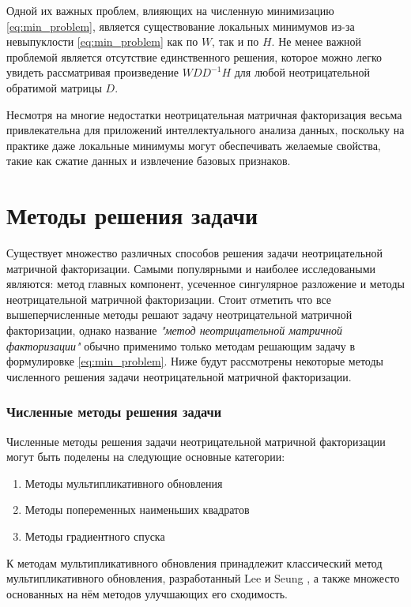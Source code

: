 Одной их важных проблем, влияющих на численную минимизацию \eqref{eq:min_problem},
является существование локальных минимумов
из-за невыпуклости \eqref{eq:min_problem} как по $W$, так и по $H$.
Не менее важной проблемой является отсутствие единственного решения,
которое можно легко увидеть рассматривая произведение $WDD^{− 1}H$ для любой неотрицательной обратимой матрицы $D$.

Несмотря на многие недостатки неотрицательная матричная факторизация весьма привлекательна для приложений интеллектуального анализа данных,
поскольку на практике даже локальные минимумы могут обеспечивать желаемые свойства, такие как сжатие данных и извлечение базовых признаков.





\newpage





\section{Методы решения задачи}

Существует множество различных способов решения задачи неотрицательной матричной факторизации.
Самыми популярными и наиболее исследоваными являются: метод главных компонент, усеченное сингулярное разложение и методы неотрицательной матричной факторизации.
Стоит отметить что все вышеперчисленные методы решают задачу неотрицательной матричной факторизации,
однако название \textit{"метод неотрицательной матричной факторизации"} обычно применимо только методам решающим задачу в формулировке \eqref{eq:min_problem}.
Ниже будут рассмотрены некоторые методы численного решения задачи неотрицательной матричной факторизации.

\subsubsection{Численные методы решения задачи}
Численные методы решения задачи неотрицательной матричной факторизации
могут быть поделены на следующие основные категории:
\begin{enumerate}
	\item Методы мультипликативного обновления
	\item Методы попеременных наименьших квадратов
	\item Методы градиентного спуска
\end{enumerate}

К методам мультипликативного обновления принадлежит классический метод мультипликативного обновления,
разработанный Lee и Seung \cite{lee_seung},
а также множесто основанных на нём методов улучшающих его сходимость.

